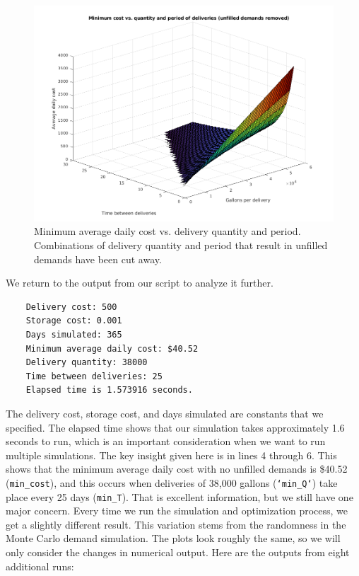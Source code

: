 \documentclass{article}
\begin{document}
    \begin{figure}[p]
        \centering
        \includegraphics[width=\textwidth]{img/surface4.png}
        \caption{Minimum average daily cost vs. delivery quantity and period. Combinations of delivery quantity and period that result in unfilled demands have been cut away.}
        \label{fig:surface4}
    \end{figure}

    \clearpage

    We return to the output from our script to analyze it further.

    \begin{verbatim}
    Delivery cost: 500
    Storage cost: 0.001
    Days simulated: 365
    Minimum average daily cost: $40.52
    Delivery quantity: 38000
    Time between deliveries: 25
    Elapsed time is 1.573916 seconds.\end{verbatim}

    The delivery cost, storage cost, and days simulated are constants that we specified. The elapsed time shows that our simulation takes approximately 1.6 seconds to run, which is an important consideration when we want to run multiple simulations. The key insight given here is in lines 4 through 6. This shows that the minimum average daily cost with no unfilled demands is \$40.52 (\texttt{min\_cost}), and this occurs when deliveries of 38,000 gallons (\texttt{`min\_Q`}) take place every 25 days (\texttt{min\_T}). That is excellent information, but we still have one major concern. Every time we run the simulation and optimization process, we get a slightly different result. This variation stems from the randomness in the Monte Carlo demand simulation. The plots look roughly the same, so we will only consider the changes in numerical output. Here are the outputs from eight additional runs:
\end{document}
